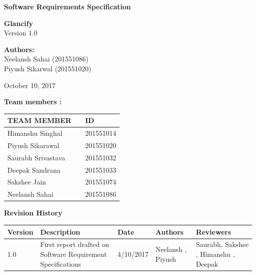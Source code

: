 \documentclass[12pt]{article}
\date{October 7 , 2017}
\begin{document}
\begin{titlepage}
	\begin{center}
		
		\LARGE{\textbf{Software Requirements Specification}}
		        
		\vspace{1.5cm}
		      
		\textbf{Glancify} \\
		\small{Version 1.0}
		
					
		\vspace{2cm}
		        
		\large{\textbf{Authors:}}\\
		\large{Neelansh Sahai (201551086)\\
		        Piyush Sikarwal (201551020)
		        }
					
		\vspace{1.5cm}
						
		\large{October  10, 2017}
						
	\end{center}
\end{titlepage}
\newpage
\textbf{Team members :} \\
\begin{center}
	\begin{tabular}{ |m{10em} m{8em} m{9em}|}
		\hline
		TEAM MEMBER        &   & ID        \\
		\hline
		Himanshu Singhal             &   & 201551014 \\
		Piyush Sikarawal          &   & 201551020 \\
		Saurabh Srivastava              &   & 201551032 \\
	    Deepak Sandrana     &   & 201551033 \\
		Sakshee Jain    &   & 201551074 \\
		Neelansh Sahai    &   & 201551086 \\ 
		\hline
	\end{tabular}
	
\end{center}
\newpage
\textbf{Revision History}
\begin{center}
		\begin{tabular}{ | m{2em} | m{8em} | m{4em} | m{5em} | m{5em} | }
			\hline
			Version & Description                         & Date       & Authors                   & Reviewers           \\
			\hline
			1.0     & First report drafted on Software Requirement Specifications & 4/10/2017  & Neelansh , Piyush & Saurabh, Sakshee , Himanshu , Deepak \\
			\hline
			
		\end{tabular}
    		
	\end{center}
\newpage
\tableofcontents
\newpage
\end{document}
